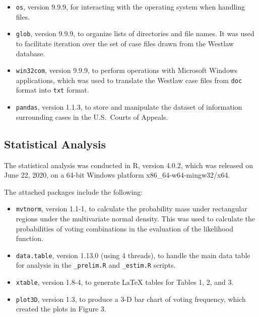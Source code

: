 \documentclass[11pt]{paper}
\begin{document}
\begin{itemize}

\item \texttt{os}, version 9.9.9, for interacting with the operating system when handling files. 
\item \texttt{glob}, version 9.9.9, to organize lists of directories and file names. 
	It was used to facilitate iteration over the set of case files drawn from the Westlaw database. 
\item \texttt{win32com}, version 9.9.9, to perform operations with Microsoft Windows applications, 
	which was used to translate the Westlaw case files from \texttt{doc} format into \texttt{txt} format. 
\item \texttt{pandas}, version 1.1.3, to store and manipulate the dataset 
	of information surrounding cases in the U.S.~Courts of Appeals. 

\end{itemize}


\subsection*{Statistical Analysis}

The statistical analysis was conducted in R, version 4.0.2,
which was released on June 22, 2020, 
on a 64-bit Windows platform x86\_64-w64-mingw32/x64. 

The attached packages include the following:

\begin{itemize}

\item \texttt{mvtnorm}, version 1.1-1, to calculate the probability mass under rectangular regions 
	under the multivariate normal density. This was used to calculate the probabilities of
	voting combinations in the evaluation of the likelihood function. 

\item \texttt{data.table}, version 1.13.0 (using 4 threads), to handle the main data table for analysis 
in the \texttt{\_prelim.R} and \texttt{\_estim.R} scripts. 

\item \texttt{xtable}, version 1.8-4, to generate LaTeX tables for Tables 1, 2, and 3.

\item \texttt{plot3D}, version 1.3, to produce a 3-D bar chart of voting frequency, which created the plots in Figure 3.


\end{itemize}
\end{document}
